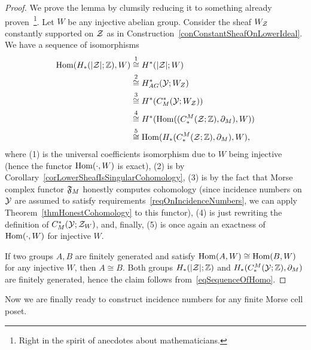 \begin{proof}
We prove the lemma by clumsily reducing it to something already proven~\footnote{Right in the spirit of anecdotes about mathematicians.}. Let $W$ be any injective abelian group. Consider the sheaf $W_{\mathcal{Z}}$ constantly supported on $\mathcal{Z}$ as in Construction~\ref{conConstantSheafOnLowerIdeal}. We have a sequence of isomorphisms
\begin{equation}\label{eqSequenceOfHomo}
  \begin{split}
\operatorname{Hom}(H_*(|\mathcal{Z}|;\mathbb{Z}),W) & \stackrel{1}{\cong} H^*(|\mathcal{Z}|;W)\\
 & \stackrel{2}{\cong} H^*_{AG}(\mathcal{Y};W_Z)\\
 & \stackrel{3}{\cong} H^*(C^*_M(\mathcal{Y};W_{\mathcal{Z}}))\\
 & \stackrel{4}{\cong} H^*(\operatorname{Hom}((C_*^M(\mathcal{Z};\mathbb{Z}),\partial_M),W))\\
 & \stackrel{5}{\cong} \operatorname{Hom}(H_*(C_*^M(\mathcal{Z};\mathbb{Z}),\partial_M),W),
\end{split}
\end{equation}
where (1) is the universal coefficients isomorphism due to $W$ being injective (hence the functor $\operatorname{Hom}(\cdot,W)$ is exact), (2) is by Corollary~\ref{corLowerSheafIsSingularCohomology}, (3) is by the fact that Morse complex functor $\mathfrak{F}_M$ honestly computes cohomology (since incidence numbers on $\mathcal{Y}$ are assumed to satisfy requirements~\ref{reqOnIncidenceNumbers}, we can apply Theorem~\ref{thmHonestCohomology} to this functor), (4) is just rewriting the definition of $C^*_M(\mathcal{Y};\mathcal{Z}_W)$, and, finally, (5) is once again an exactness of $\operatorname{Hom}(\cdot,W)$ for injective $W$.

If two groups $A,B$ are finitely generated and satisfy $\operatorname{Hom}(A,W)\cong\operatorname{Hom}(B,W)$ for any injective $W$, then $A\cong B$. Both groups $H_*(|\mathcal{Z}|;\mathbb{Z})$ and $H_*(C_*^M(\mathcal{Y};\mathbb{Z}),\partial_M)$ are finitely generated, hence the claim follows from~\eqref{eqSequenceOfHomo}.
\end{proof}

Now we are finally ready to construct incidence numbers for any finite Morse cell poset.

